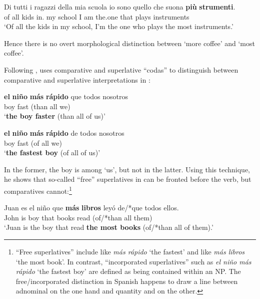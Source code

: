 \documentclass[output=paper
,modfonts
,nonflat]{langsci/langscibook}
\begin{document}
\ea \label{ex:coppockstrand:66}
\gll Di tutti i ragazzi della mia scuola io sono quello che suona \textbf{più} \textbf{strumenti}.\\
of all  kids in. my school I am the.one that plays \cmpr{} instruments\\ 
\glt `Of all the kids in my school, I'm the one who plays the most instruments.'
\z

Hence there is no overt morphological distinction between `more coffee' and `most coffee'.

Following \citet{BosqueBrucart1991}, \citet{Rohena-Madrazo2007} uses comparative and superlative ``codas'' to distinguish between comparative and superlative interpretations in :

\ea \label{ex:coppockstrand:67}
\gll \textbf{el} \textbf{ni\~no} \textbf{m\'as} \textbf{r\'apido} {\op}que todos nosotros{\cp}\\
 boy \cmpr{} fast (than all we)\\ 
\glt `\textbf{the boy faster} (than all of us)'
\z

\ea \label{ex:coppockstrand:68}
\gll \textbf{el} \textbf{ni\~no} \textbf{m\'as} \textbf{r\'apido} {\op}de todos nosotros{\cp}\\
 boy \cmpr{} fast (of all we)\\ 
\glt `\textbf{the fastest boy} (of all of us)'
\z

In the former, the boy is among `us', but not in the latter. Using this technique, he shows that so-called ``free'' superlatives in  can be fronted before the verb, but comparatives cannot:\footnote{``Free superlatives'' include  like \textit{m\'as r\'apido} `the fastest' and  like \textit{m\'as libros} `the most book'. In contrast, ``incorporated superlatives'' such as \textit{el ni\~no m\'as r\'apido} `the fastest boy' are defined as being contained within an NP. The free/incorporated distinction in Spanish happens to draw a line between adnominal  on the one hand and quantity and  on the other.}

\ea \label{ex:coppockstrand:69}
\gll Juan es el ni\~no que \textbf{m\'as} \textbf{libros} ley\'o {\op}de\textnormal{/*}que todos ellos{\cp}.\\
John is  boy that \cmpr{} books read (of/*than all them)\\ 
\glt `Juan is the boy that read \textbf{the most books} (of/*than all of them).'
\z
\end{document}
